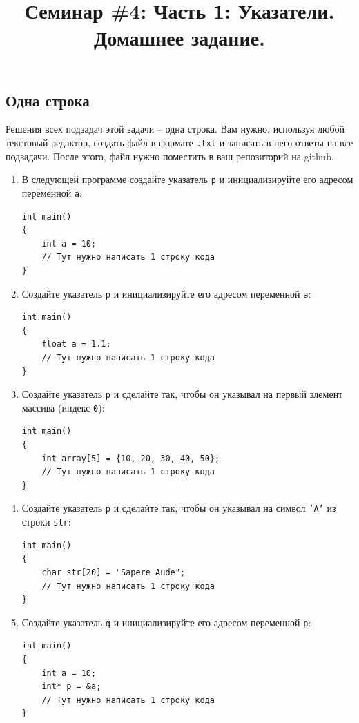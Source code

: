 \documentclass[10pt]{article}
\begin{document}
\title{Семинар \#4: Часть 1: Указатели. Домашнее задание. \vspace{-5ex}}\date{}\maketitle

\subsection{Одна строка}
Решения всех подзадач этой задачи -- одна строка. Вам нужно, используя любой текстовый редактор, создать файл в формате \texttt{.txt} и записать в него ответы на все подзадачи. После этого, файл нужно поместить в ваш репозиторий на github.

\begin{enumerate}
\item В следующей программе создайте указатель \texttt{p} и инициализируйте его адресом переменной \texttt{a}:
\begin{lstlisting}
int main() 
{
    int a = 10;
    // Тут нужно написать 1 строку кода
}
\end{lstlisting}

\item Создайте указатель \texttt{p} и инициализируйте его адресом переменной \texttt{a}:
\begin{lstlisting}
int main() 
{
    float a = 1.1;
    // Тут нужно написать 1 строку кода
}
\end{lstlisting}


\item Создайте указатель \texttt{p} и сделайте так, чтобы он указывал на первый элемент массива (индекс \texttt{0}):
\begin{lstlisting}
int main() 
{
    int array[5] = {10, 20, 30, 40, 50};
    // Тут нужно написать 1 строку кода
}
\end{lstlisting}


\item Создайте указатель \texttt{p} и сделайте так, чтобы он указывал на символ \texttt{'A'}  из строки \texttt{str}:
\begin{lstlisting}
int main() 
{
    char str[20] = "Sapere Aude";
    // Тут нужно написать 1 строку кода
}
\end{lstlisting}

\item Создайте указатель \texttt{q} и инициализируйте его адресом переменной \texttt{p}:
\begin{lstlisting}
int main() 
{
    int a = 10;
    int* p = &a;
    // Тут нужно написать 1 строку кода
}
\end{lstlisting}


\end{enumerate}
\end{document}
